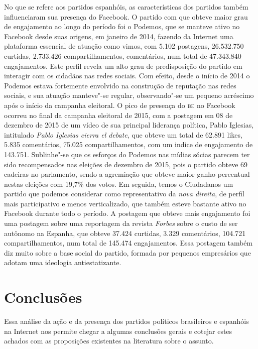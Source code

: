 No que se refere aos partidos espanhóis, as características dos partidos
também influenciaram sua presença do Facebook. O partido com que obteve
maior grau de engajamento ao longo do período foi o Podemos, que se
manteve ativo no Facebook desde suas origens, em janeiro de 2014,
fazendo da Internet uma plataforma essencial de atuação como vimos, com
5.102 postagens, 26.532.750 curtidas, 2.733.426 compartilhamentos,
comentários, num total de 47.343.840 engajamentos. Este perfil revela um
alto grau de predisposição do partido em interagir com os cidadãos nas
redes sociais. Com efeito, desde o início de 2014 o Podemos estava
fortemente envolvido na construção de reputação nas redes sociais, e sua
atuação manteve"-se regular, observando"-se um pequeno acréscimo após o
início da campanha eleitoral. O pico de presença do \textsc{be} no Facebook
ocorreu no final da campanha eleitoral de 2015, com a postagem em
08 de dezembro de 2015 de um vídeo de sua principal liderança política, Pablo
Iglesias, intitulado \textit{Pablo Iglesias cierra el debate}, que obteve
um total de 62.891 likes, 5.835 comentários, 75.025 compartilhamentos,
com um indice de engajamento de 143.751. Sublinhe"-se que os esforços do
Podemos nas mídias sócias parecem ter sido recompensados nas eleições de
dezembro de 2015, pois o partido obteve 69 cadeiras no parlamento, sendo
a agremiação que obteve maior ganho percentual nestas eleições com
19,7\% dos votos. Em seguida, temos o Ciudadanos um partido que podemos
considerar como representativo da \textit{nova direita}, de perfil mais
participativo e menos verticalizado, que também esteve bastante ativo no
Facebook durante todo o período. A postagem que obteve mais engajamento
foi uma postagem sobre uma reportagem da revista \textit{Forbes} sobre o
custo de ser autônomo na Espanha, que obteve 37.424 curtidas, 3.329
comentários, 104.721 compartilhamentos, num total de 145.474
engajamentos. Essa postagem também diz muito sobre a base social do
partido, formada por pequenos empresários que adotam uma ideologia
antiestatizante.


\section{Conclusões}

Essa análise da ação e da presença dos partidos políticos brasileiros e
espanhóis na Internet nos permite chegar a algumas conclusões gerais e
cotejar estes achados com as proposições existentes na literatura sobre
o assunto.

